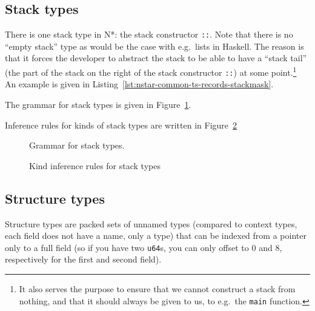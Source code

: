 \subsection{Stack types}\label{subsec:nstar-common-ts-stack}

There is one stack type in N*: the stack constructor \texttt{::}.
Note that there is no ``empty stack'' type as would be the case with e.g.\ lists in Haskell.
The reason is that it forces the developer to abstract the stack to be able to have a ``stack tail'' (the part of the stack on the right of the stack constructor \texttt{::}) at some point.\footnote{It also serves the purpose to ensure that we cannot construct a stack from nothing, and that it should always be given to us, to e.g.\ the \texttt{main} function.}
An example is given in Listing~\ref{lst:nstar-common-ts-records-stackmask}.

The grammar for stack types is given in Figure~\ref{fig:nstar-common-ts-stack-types-syntax}.

Inference rules for kinds of stack types are written in Figure~\ref{fig:nstar-common-ts-stack-types-kindrules}

\begin{figure}[htb]
  \centering
  \caption{Grammar for stack types.}
  \label{fig:nstar-common-ts-stack-types-syntax}
\end{figure}

\begin{figure}[htb]
  \centering

  \begin{prooftree}
  \end{prooftree}

  \caption{Kind inference rules for stack types}
  \label{fig:nstar-common-ts-stack-types-kindrules}
\end{figure}

\subsection{Structure types}\label{subsec:nstar-common-ts-structs}

Structure types are packed sets of unnamed types (compared to context types, each field does not have a name, only a type) that can be indexed from a pointer only to a full field (so if you have two \texttt{u64}s, you can only offset to $0$ and $8$, respectively for the first and second field).

